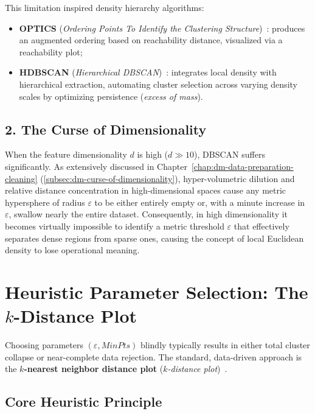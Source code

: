 This limitation inspired density hierarchy algorithms:
\begin{itemize}
    \item \textbf{OPTICS} (\textit{Ordering Points To Identify the Clustering Structure})~\cite{ankerst1999}: produces an augmented ordering based on reachability distance, visualized via a reachability plot;
    \item \textbf{HDBSCAN} (\textit{Hierarchical DBSCAN})~\cite{campello2015}: integrates local density with hierarchical extraction, automating cluster selection across varying density scales by optimizing persistence (\textit{excess of mass}).
\end{itemize}

\subsection{2. The Curse of Dimensionality}

When the feature dimensionality $d$ is high ($d \gg 10$), DBSCAN suffers significantly. As extensively discussed in Chapter~\ref{chap:dm-data-preparation-cleaning} (\autoref{subsec:dm-curse-of-dimensionality}), hyper-volumetric dilution and relative distance concentration in high-dimensional spaces cause any metric hypersphere of radius $\varepsilon$ to be either entirely empty or, with a minute increase in $\varepsilon$, swallow nearly the entire dataset. Consequently, in high dimensionality it becomes virtually impossible to identify a metric threshold $\varepsilon$ that effectively separates dense regions from sparse ones, causing the concept of local Euclidean density to lose operational meaning.


\section{Heuristic Parameter Selection: The \texorpdfstring{$k$}{k}-Distance Plot}
\label{sec:dm-dbscan-parameter-selection}

Choosing parameters $(\varepsilon, MinPts)$ blindly typically results in either total cluster collapse or near-complete data rejection. The standard, data-driven approach is the \textbf{$k$-nearest neighbor distance plot} (\textit{$k$-distance plot})~\cite{ester1996, tan2018}.

\subsection{Core Heuristic Principle}

